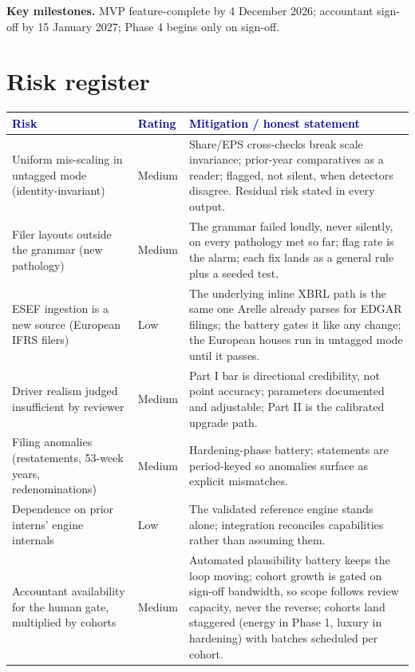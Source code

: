 \documentclass[11pt]{article}
\newcommand{\lead}[2]{\par\addvspace{5pt}\textbf{\textcolor{#1}{#2}}}
\newcommand{\headtext}[1]{\textcolor{navy}{\textbf{#1}}}
\begin{document}
\vspace{4pt}
\lead{navytwo}{Key milestones.} MVP feature-complete by 4 December 2026; accountant sign-off by 15 January 2027; Phase 4 begins only on sign-off.

\section{Risk register}
\label{sec:limits}
\noindent\begin{minipage}{\linewidth}
\renewcommand{\arraystretch}{1.12}
\begin{tabularx}{\linewidth}{>{\raggedright\arraybackslash}p{4.2cm} >{\raggedright\arraybackslash}p{1.6cm} X}
\hline
\rowcolor{tblhead} \headtext{Risk} & \headtext{Rating} & \headtext{Mitigation / honest statement} \\ \hline
Uniform mis-scaling in untagged mode (identity-invariant) & Medium & Share/EPS cross-checks break scale invariance; prior-year comparatives as a reader; flagged, not silent, when detectors disagree. Residual risk stated in every output. \\ \hline
Filer layouts outside the grammar (new pathology) & Medium & The grammar failed loudly, never silently, on every pathology met so far; flag rate is the alarm; each fix lands as a general rule plus a seeded test. \\ \hline
ESEF ingestion is a new source (European IFRS filers) & Low & The underlying inline XBRL path is the same one Arelle already parses for EDGAR filings; the battery gates it like any change; the European houses run in untagged mode until it passes. \\ \hline
Driver realism judged insufficient by reviewer & Medium & Part I bar is directional credibility, not point accuracy; parameters documented and adjustable; Part II is the calibrated upgrade path. \\ \hline
Filing anomalies (restatements, 53-week years, redenominations) & Medium & Hardening-phase battery; statements are period-keyed so anomalies surface as explicit mismatches. \\ \hline
Dependence on prior interns' engine internals & Low & The validated reference engine stands alone; integration reconciles capabilities rather than assuming them. \\ \hline
Accountant availability for the human gate, multiplied by cohorts & Medium & Automated plausibility battery keeps the loop moving; cohort growth is gated on sign-off bandwidth, so scope follows review capacity, never the reverse; cohorts land staggered (energy in Phase 1, luxury in hardening) with batches scheduled per cohort. \\ \hline
\end{tabularx}
\end{minipage}
\end{document}

